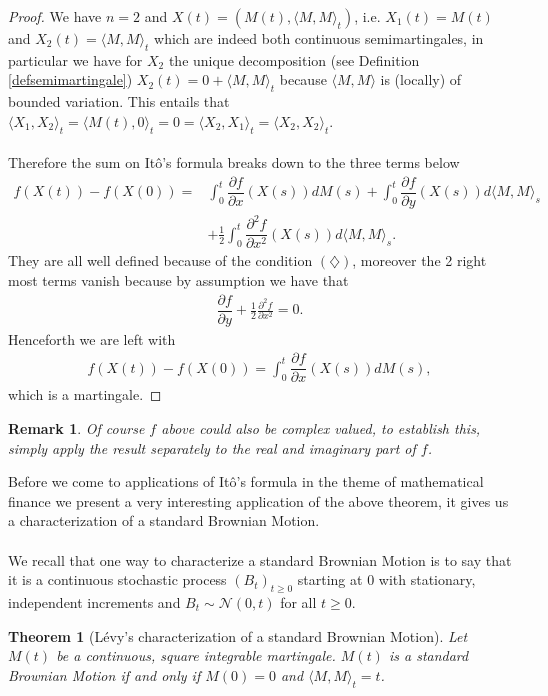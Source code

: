 \documentclass[11pt,a4paper, final]{article}
\newtheorem{thm}{Theorem}[section]
\newtheorem{rem}{Remark}[defn]
\begin{document}
\begin{proof}
We have $n=2$ and $X(t)=(M(t), \langle M, M \rangle_t)$, i.e. $X_1(t)=  M(t)$ and $X_2(t)= \langle M, M \rangle_t$ which are indeed both continuous semimartingales, in particular we have for $X_2$ the unique decomposition (see Definition \ref{defsemimartingale}) $X_2(t)=0 + \langle M, M \rangle_t$ because $\langle M, M \rangle$ is (locally) of bounded variation. This entails that $\langle X_1, X_2 \rangle_t = \langle M(t), 0 \rangle_t=0= \langle X_2, X_1 \rangle_t = \langle X_2, X_2 \rangle_t$.  
\\\\
Therefore the sum on Itô's formula breaks down to the three terms below
\begin{align*}
f(X(t))-f(X(0)) = &\int_0^t \dfrac{\partial f}{\partial x}(X(s))dM(s) + \int_0^t \dfrac{\partial f}{\partial y}(X(s)) d \langle M, M \rangle_s  \\
& +\frac{1}{2} \int_0^t \dfrac{\partial^2f}{\partial x^2}(X(s)) d \langle M, M \rangle_s.
\end{align*}
They are all well defined because of the condition $(\diamondsuit)$, moreover the 2 right most terms vanish because by assumption we have that 
\begin{align*}
\dfrac{\partial f}{\partial y}+ \frac{1}{2} \frac{\partial^2 f}{\partial x^2} =0.
\end{align*}
Henceforth we are left with
\begin{align*}
f(X(t))-f(X(0)) = \int_0^t \dfrac{\partial f}{\partial x} (X(s)) dM(s),
\end{align*}
which is a martingale. 
\end{proof}
\begin{rem} Of course $f$ above could also be complex valued, to establish this, simply apply the result separately to the real and imaginary part of $f$.
\end{rem}
\noindent Before we come to applications of Itô's formula in the theme of mathematical finance we present a very interesting application of the above theorem, it gives us a characterization of a standard Brownian Motion. 
\\\\
We recall that one way to characterize a standard Brownian Motion is to say that it is a continuous stochastic process $(B_t)_{t \geq 0}$ starting at $0$ with stationary, independent increments and $B_t \sim \mathcal{N}(0,t)$ for all $t \geq 0$. 
\newpage
\begin{thm}[Lévy's characterization of a standard Brownian Motion] Let $M(t)$ be a continuous, square integrable martingale. $M(t)$ is a standard Brownian Motion if and only if $M(0)=0$ and $\langle M,M \rangle_t = t$.
\end{thm}
\end{document}
